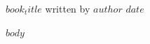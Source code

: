 \documentclass[12pt]{article}
\def\booktitle{$book_title$}
\def\bookauthor{$author$}
\def\bookdate{$date$}
\begin{document}
\thispagestyle{empty}
\begin{center}
\vspace*{3in}
{\LARGE\bfseries\booktitle}
\bigskip
\bigskip
written by
\bigskip
\bookauthor
\vfill
\bookdate
\end{center}

\mainmatter

$body$
\end{document}
